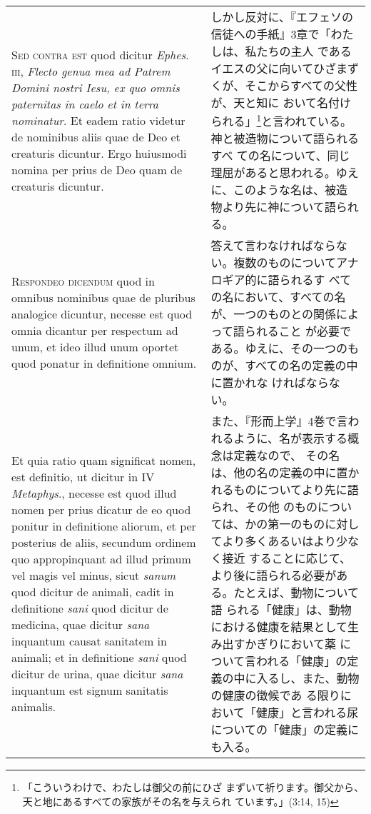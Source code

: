 \documentclass[10pt]{jsarticle}
\begin{document}
\begin{longtable}{p{21em}p{21em}}
\\

{\scshape Sed contra est} quod dicitur {\itshape Ephes}.~{\scshape
iii}, {\itshape Flecto genua mea ad Patrem Domini nostri Iesu, ex quo
omnis paternitas in caelo et in terra nominatur}. Et eadem ratio
videtur de nominibus aliis quae de Deo et creaturis dicuntur. Ergo
huiusmodi nomina per prius de Deo quam de creaturis dicuntur.

&

しかし反対に、『エフェソの信徒への手紙』3章で「わたしは、私たちの主人
であるイエスの父に向いてひざまずくが、そこからすべての父性が、天と知に
おいて名付けられる」\footnote{「こういうわけで、わたしは御父の前にひざ
まずいて祈ります。御父から、天と地にあるすべての家族がその名を与えられ
ています。」(3:14, 15) }と言われている。神と被造物について語られるすべ
ての名について、同じ理屈があると思われる。ゆえに、このような名は、被造
物より先に神について語られる。

\\

{\scshape Respondeo dicendum} quod in omnibus nominibus quae de
pluribus analogice dicuntur, necesse est quod omnia dicantur per
respectum ad unum, et ideo illud unum oportet quod ponatur in
definitione omnium.

&

答えて言わなければならない。複数のものについてアナロギア的に語られるす
べての名において、すべての名が、一つのものとの関係によって語られること
が必要である。ゆえに、その一つのものが、すべての名の定義の中に置かれな
ければならない。

\\

Et quia ratio quam significat nomen, est definitio, ut dicitur in IV
{\itshape Metaphys}., necesse est quod illud nomen per prius dicatur
de eo quod ponitur in definitione aliorum, et per posterius de aliis,
secundum ordinem quo appropinquant ad illud primum vel magis vel
minus, sicut {\itshape sanum} quod dicitur de animali, cadit in
definitione {\itshape sani} quod dicitur de medicina, quae dicitur
{\itshape sana} inquantum causat sanitatem in animali; et in
definitione {\itshape sani} quod dicitur de urina, quae dicitur
{\itshape sana} inquantum est signum sanitatis animalis.

&

また、『形而上学』4巻で言われるように、名が表示する概念は定義なので、
その名は、他の名の定義の中に置かれるものについてより先に語られ、その他
のものについては、かの第一のものに対してより多くあるいはより少なく接近
することに応じて、より後に語られる必要がある。たとえば、動物について語
られる「健康」は、動物における健康を結果として生み出すかぎりにおいて薬
について言われる「健康」の定義の中に入るし、また、動物の健康の徴候であ
る限りにおいて「健康」と言われる尿についての「健康」の定義にも入る。


\end{longtable}
\end{document}
